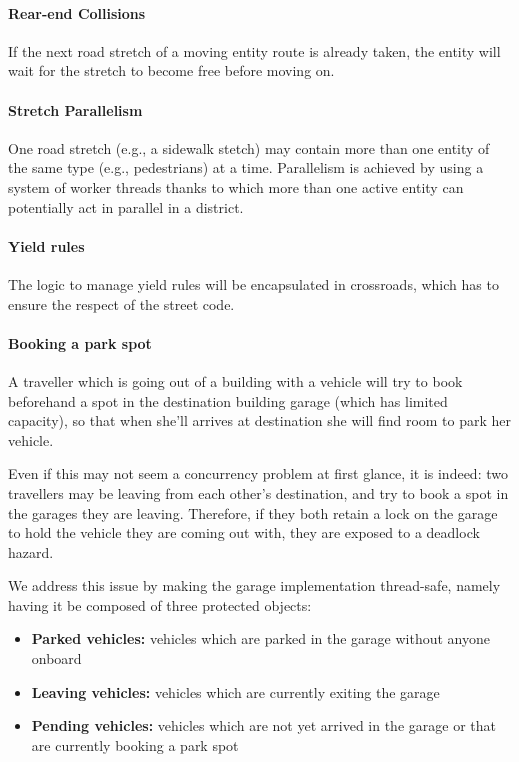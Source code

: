 \paragraph{Rear-end Collisions}
If the next road stretch of a moving entity route is already taken, the entity
will wait for the stretch to become free before moving on.

\paragraph{Stretch Parallelism}
One road stretch (e.g., a sidewalk stetch) may contain more than one entity of
the same type (e.g., pedestrians) at a time.
Parallelism is achieved by using a system of worker threads thanks to which
more than one active entity can potentially act in parallel in a district.

\paragraph{Yield rules}
The logic to manage yield rules will be encapsulated in crossroads, which has
to ensure the respect of the street code.

\paragraph{Booking a park spot}
A traveller which is going out of a building with a vehicle will try to book
beforehand a spot in the destination building garage (which has limited
capacity), so that when she'll arrives at destination she will find room to
park her vehicle.

Even if this may not seem a concurrency problem at first glance, it is indeed:
two travellers may be leaving from each other's destination, and try to book a
spot in the garages they are leaving.
Therefore, if they both retain a lock on the garage to hold the vehicle they
are coming out with, they are exposed to a deadlock hazard.

We address this issue by making the garage implementation thread-safe, namely
having it be composed of three protected objects:

\begin{itemize}
  \item \textbf{Parked vehicles:} vehicles which are parked in the garage
    without anyone onboard
  \item \textbf{Leaving vehicles:} vehicles which are currently exiting the
    garage
  \item \textbf{Pending vehicles:} vehicles which are not yet arrived in the
    garage or that are currently booking a park spot
\end{itemize}

